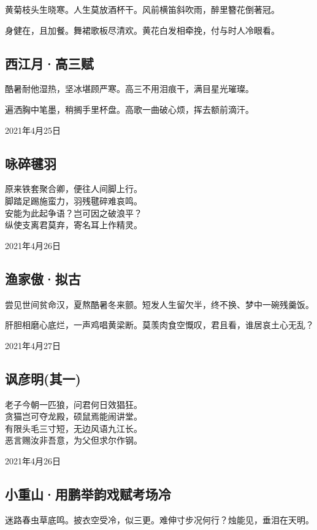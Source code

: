 \documentclass[a5paper]{ctexart}
\begin{document}
	黄菊枝头生晓寒。人生莫放酒杯干。风前横笛斜吹雨，醉里簪花倒著冠。
	
	身健在，且加餐。舞裙歌板尽清欢。黄花白发相牵挽，付与时人冷眼看。
	
	\subsection{西江月·高三赋}
	酷暑耐他湿热，坚冰堪顾严寒。高三不用泪痕干，满目星光璀璨。
	
	遍洒胸中笔墨，稍搁手里杯盘。高歌一曲破心烦，挥去额前滴汗。
	\begin{flushright}
		2021年4月25日
	\end{flushright}
	
	\subsection{咏碎毽羽}
	\begin{center}
		原来铁套聚合卿，便往人间脚上行。\\
		脚踏足踢施蛮力，羽残毽碎难哀鸣。\\
		安能为此起争语？岂可因之破浪平？\\
		纵使支离君莫弃，寄名耳上作精灵。
	\end{center}
	\hfill 2021年4月26日
	
	
	\subsection{渔家傲·拟古}
	尝见世间贫命汉，夏熬酷暑冬来颤。短发人生留欠半，终不换、梦中一碗残羹饭。
	
	肝胆相磨心底烂，一声鸡唱黄梁断。莫羡肉食空慨叹，君且看，谁居哀土心无乱？
	\begin{flushright}
		2021年4月27日
	\end{flushright}
	
	\subsection{讽彦明(其一)}
	\begin{center}
		老子今朝一匹狼，问君何日效猖狂。\\
		贪猫岂可夺龙殿，硕鼠焉能闹讲堂。\\
		有限头毛三寸短，无边风语九江长。\\
		恶言赐汝非吾意，为父但求尔作钢。\\
	\end{center}
	\hfill 2021年4月26日
	
	\subsection{小重山·用鹏举韵戏赋考场冷}
	迷路春虫草底鸣。披衣空受冷，似三更。难伸寸步况何行？烛能见，垂泪在天明。
	
\end{document}
